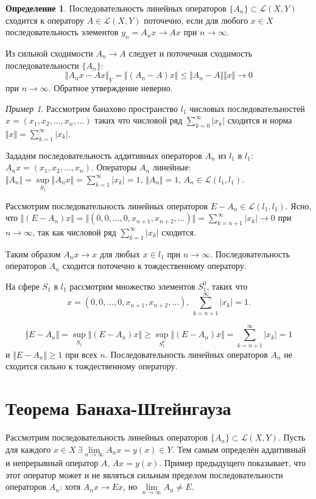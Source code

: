 \documentclass[12pt,a4paper,titlepage,oneside]{book}
\theoremstyle{definition}
\newtheorem*{definition}{Определение}
\theoremstyle{plain}
\theoremstyle{break}
\theoremstyle{remark}
\theoremstyle{remark}
\newtheorem*{example}{Пример}
\theoremstyle{remark}
\theoremstyle{remark}
\theoremstyle{plain}
\theoremstyle{plain}
\begin{document}
\begin{definition}
Последовательность линейных операторов $\{A_n\} \subset \mathcal{L}(X,Y)$ сходится к оператору $A\in \mathcal{L}(X,Y)$ поточечно, если для любого $x\in X$ последовательность элементов $y_n=A_nx\to Ax$ при $n\to \infty$.
\end{definition}

Из сильной сходимости $A_n\to A$ следует и поточечная сходимость последовательности $\{A_n\}$:
$$\Vert A_nx-Ax\Vert_Y = \Vert(A_n-A)x\Vert\le \Vert A_n-A\Vert \Vert x\Vert\to 0$$ 
при $n\to \infty$.
Обратное утверждение неверно.

\begin{example}
Рассмотрим банахово пространство $l_1$ числовых последовательностей $x=(x_1,x_2,\ldots,x_n,\ldots)$ таких что числовой ряд $\displaystyle\sum_{k=0}^\infty \lvert x_k\rvert $ сходится и норма $\Vert x\Vert=\displaystyle\sum_{k=1}^\infty \lvert x_k\rvert$.

Зададим последовательность аддитивных операторов $A_n$ из $l_1$ в $l_1$: 
$A_nx=(x_1,x_2,\ldots,x_n)$.
Операторы $A_n$ линейные:
$\Vert A_n\Vert=\sup \limits_{S_1} \Vert A_nx\Vert=\displaystyle\sum_{k=1}^\infty \lvert x_k\rvert =1$, $\Vert A_n\Vert=1$, $A_n\in \mathcal{L}(l_1,l_1)$.

Рассмотрим последовательность линейных операторов $E-A_n\in \mathcal{L}(l_1,l_1)$. Ясно, что $\Vert(E-A_n)x\Vert=\Vert(0,0,\ldots,0,x_{n+1},x_{n+2},\ldots)\Vert=\displaystyle\sum_{k=n+1}^\infty \lvert x_k\rvert  \to 0$ при $n\to \infty$, так как числовой ряд $\displaystyle\sum_{k=1}^\infty \lvert x_k\rvert $ сходится.

Таким образом $A_nx\to x$ для любых $x\in l_1$ при $n\to \infty$. Последовательность операторов $A_n$ сходится поточечно к тождественному оператору.

На сфере $S_1$ в $l_1$ рассмотрим множество элементов $S_1^0$, таких что 
$$x=(0,0,\ldots,0,x_{n+1},x_{n+2},\ldots) \mbox{, } \displaystyle\sum_{k=n+1}^\infty \lvert x_k\rvert=1.$$

$$\Vert E-A_n\Vert=\sup \limits_{S_1} \Vert(E-A_n)x\Vert \geqslant \sup \limits_{S_1^0} \Vert(E-A_n)x\Vert=\displaystyle\sum_{k=n+1}^\infty \lvert x_k\rvert=1$$
и $\Vert E-A_n\Vert \geqslant 1$ при всех $n$. Последовательность линейных операторов $A_n$ не сходится сильно к тождественному оператору.

\end{example}

\section{Теорема Банаха-Штейнгауза}
Рассмотрим последовательность линейных операторов $\lbrace A_n \rbrace \subset \mathcal{L}(X,Y)$. Пусть для каждого $x \in X\ \exists \lim\limits_{n\to \infty}A_n x = y(x) \in Y$. Тем самым определён аддитивный и непрерывный оператор $A$, $Ax = y(x)$. Пример предыдущего  показывает, что этот оператор может и не являться сильным пределом последовательности операторов $A_n$: хотя $A_n x \to E x$, но $\lim \limits_{n \to \infty} A_n \ne E$.
\end{document}
